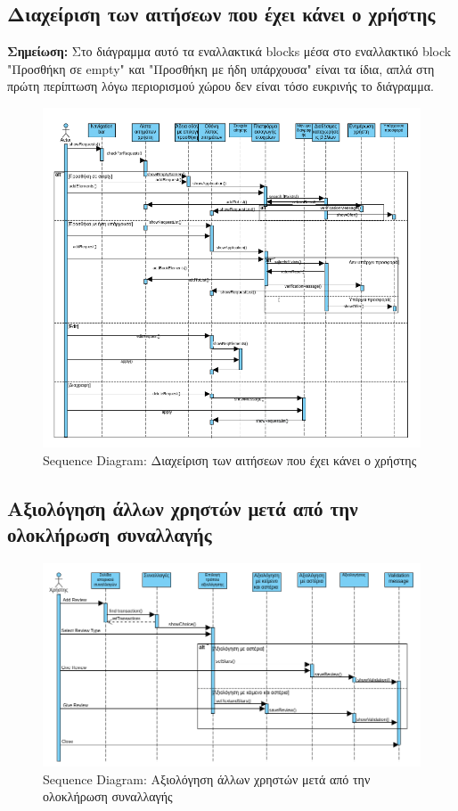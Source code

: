 \documentclass[12pt,a4paper]{article}
\begin{document}
\subsection{Διαχείριση των αιτήσεων που έχει κάνει ο χρήστης}
\textbf{Σημείωση:} Στο διάγραμμα αυτό τα εναλλακτικά blocks μέσα στο εναλλακτικό block "Προσθήκη σε empty" και "Προσθήκη με ήδη υπάρχουσα" είναι τα ίδια, απλά στη πρώτη περίπτωση λόγω περιορισμού χώρου δεν είναι τόσο ευκρινής το διάγραμμα.
\begin{figure}[H]
	\includegraphics[width=\textwidth]{Manage User Requests Sequence.png}
	\caption{Sequence Diagram: Διαχείριση των αιτήσεων που έχει κάνει ο χρήστης}
	\label{Sequence Diagram: Διαχείριση των αιτήσεων που έχει κάνει ο χρήστης}
\end{figure}

\subsection{Αξιολόγηση άλλων χρηστών μετά από την ολοκλήρωση συναλλαγής}
\begin{figure}[H]
	\includegraphics[width=\textwidth]{Review after Transaction Sequence.png}
	\caption{Sequence Diagram: Αξιολόγηση άλλων χρηστών μετά από την ολοκλήρωση συναλλαγής}
	\label{Sequence Diagram: Αξιολόγηση άλλων χρηστών μετά από την ολοκλήρωση συναλλαγής}
\end{figure}
\end{document}
